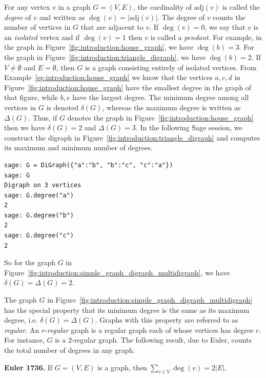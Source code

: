For any vertex $v$ in a graph $G = (V, E)$, the cardinality of
$\text{adj}(v)$ is called the \emph{degree} of $v$ and written as
$\deg(v) = |\text{adj}(v)|$\index{$\deg$}. The degree of $v$ counts
the number of vertices in $G$ that are adjacent to $v$. If
$\deg(v) = 0$, we say that $v$ is an
\emph{isolated} vertex and if $\deg(v) = 1$
then $v$ is called a \emph{pendant}. For example, in
the graph in Figure~\ref{fig:introduction:house_graph}, we have
$\deg(b) = 3$. For the graph in
Figure~\ref{fig:introduction:triangle_digraph}, we have
$\deg(b) = 2$. If $V \neq \emptyset$ and $E = \emptyset$, then
$G$ is a graph consisting entirely of isolated vertices. From
Example~\ref{eg:introduction:house_graph} we know that the vertices
$a, c, d$ in Figure~\ref{fig:introduction:house_graph} have the
smallest degree in the graph of that figure, while $b, e$ have the
largest degree. The minimum degree among all vertices in $G$ is
denoted $\delta(G)$, whereas the maximum degree is written as
$\Delta(G)$. Thus, if $G$ denotes the graph in
Figure~\ref{fig:introduction:house_graph} then we have $\delta(G) = 2$
and $\Delta(G) = 3$. In the following Sage session, we construct the
digraph in Figure~\ref{fig:introduction:triangle_digraph} and computes
its maximum and minimum number of degrees.
\index{$\delta$}
\index{$\Delta$}
%
\begin{lstlisting}
sage: G = DiGraph({"a":"b", "b":"c", "c":"a"})
sage: G
Digraph on 3 vertices
sage: G.degree("a")
2
sage: G.degree("b")
2
sage: G.degree("c")
2
\end{lstlisting}
%
So for the graph $G$ in
Figure~\ref{fig:introduction:simple_graph_digraph_multidigraph}, we have
$\delta(G) = \Delta(G) = 2$.

The graph $G$ in
Figure~\ref{fig:introduction:simple_graph_digraph_multidigraph}
has the special property that its minimum degree is the same as its
maximum degree, i.e. $\delta(G) = \Delta(G)$. Graphs with this
property are referred to as \emph{regular}. An $r$-\emph{regular}
graph is a regular graph each of whose vertices has degree $r$. For
instance, $G$ is a $2$-regular graph. The following result, due to
Euler, counts the total number of degrees in any graph.

\begin{theorem}
\label{thm:introduction:degree_sum}
\label{thm:introduction:hand_shaking}
\textbf{Euler 1736.}
If $G = (V, E)$ is a graph, then $\sum_{v \in V} \deg(v) = 2 |E|$.
\end{theorem}

